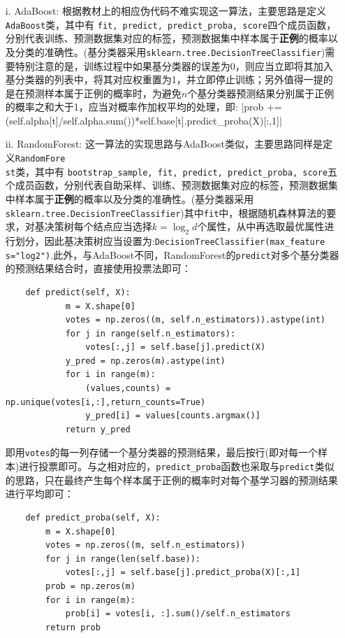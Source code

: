 \documentclass[a4paper,UTF8]{article}
\theoremstyle{definition}
\begin{document}
\begin{itemize}
\item[i.] AdaBoost: 根据教材上的相应伪代码不难实现这一算法，主要思路是定义\texttt{AdaBoost}类，其中有
\texttt{fit, predict, predict\_proba, score}四个成员函数，分别代表训练、预测数据集对应的标签，预测数据集中样本属于\textbf{正例}的概率以及分类的准确性。(基分类器采用\texttt{sklearn.tree.DecisionTreeClassifier})需要特别注意的是，训练过程中如果基分类器的误差为0，则应当立即将其加入基分类器的列表中，将其对应权重置为1，并立即停止训练；另外值得一提的是在预测样本属于正例的概率时，为避免$n$个基分类器预测结果分别属于正例的概率之和大于1，应当对概率作加权平均的处理，即:
|prob += (self.alpha[t]/self.alpha.sum())*self.base[t].predict_proba(X)[:,1]|
\item[ii.] RandomForest: 这一算法的实现思路与AdaBoost类似，主要思路同样是定义\texttt{RandomFore\\st}类，其中有
\texttt{bootstrap\_sample, fit, predict, predict\_proba, score}五个成员函数，分别代表自助采样、训练、预测数据集对应的标签，预测数据集中样本属于\textbf{正例}的概率以及分类的准确性。(基分类器采用\texttt{sklearn.tree.DecisionTreeClassifier})其中\texttt{fit}中，根据随机森林算法的要求，对基决策树每个结点应当选择$k=\log_2{d}$个属性，从中再选取最优属性进行划分，因此基决策树应当设置为:\texttt{DecisionTreeClassifier(max\_feature\\s="log2")}.此外，与AdaBoost不同，RandomForest的\texttt{predict}对多个基分类器的预测结果结合时，直接使用投票法即可：
\begin{verbatim}
    def predict(self, X):
            m = X.shape[0]
            votes = np.zeros((m, self.n_estimators)).astype(int)
            for j in range(self.n_estimators):
                votes[:,j] = self.base[j].predict(X)
            y_pred = np.zeros(m).astype(int)
            for i in range(m):
                (values,counts) = np.unique(votes[i,:],return_counts=True)
                y_pred[i] = values[counts.argmax()]
            return y_pred
\end{verbatim}
即用\texttt{votes}的每一列存储一个基分类器的预测结果，最后按行(即对每一个样本)进行投票即可。与之相对应的，\texttt{predict\_proba}函数也采取与\texttt{predict}类似的思路，只在最终产生每个样本属于正例的概率时对每个基学习器的预测结果进行平均即可：
\begin{verbatim}
    def predict_proba(self, X):
        m = X.shape[0]
        votes = np.zeros((m, self.n_estimators))
        for j in range(len(self.base)):
            votes[:,j] = self.base[j].predict_proba(X)[:,1]
        prob = np.zeros(m)
        for i in range(m):
            prob[i] = votes[i, :].sum()/self.n_estimators
        return prob
\end{verbatim}
\end{itemize}
\end{document}
